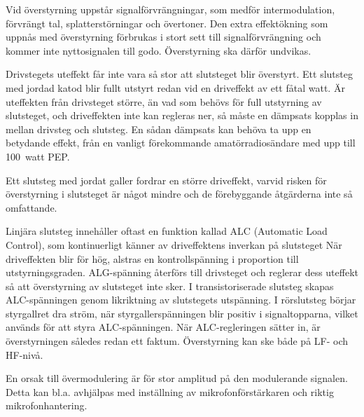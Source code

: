 Vid överstyrning uppstår signalförvrängningar, som medför
intermodulation, förvrängt tal, splatterstörningar och övertoner. Den
extra effektökning som uppnås med överstyrning förbrukas i stort sett
till signalförvrängning och kommer inte nyttosignalen till
godo. Överstyrning ska därför undvikas.

Drivstegets uteffekt får inte vara så stor att slutsteget blir
överstyrt. Ett slutsteg med jordad katod blir fullt utstyrt redan vid
en driveffekt av ett fåtal watt. Är uteffekten från drivsteget större,
än vad som behövs för full utstyrning av slutsteget, och driveffekten
inte kan regleras ner, så måste en dämpsats kopplas in mellan drivsteg
och slutsteg. En sådan dämpsats kan behöva ta upp en betydande effekt,
från en vanligt förekommande amatörradiosändare med upp till 100~watt PEP.

Ett slutsteg med jordat galler fordrar en större driveffekt, varvid
risken för överstyrning i slutsteget är något mindre och de
förebyggande åtgärderna inte så omfattande.

Linjära slutsteg innehåller oftast en funktion kallad ALC (Automatic
Load Control), som kontinuerligt känner av driveffektens inverkan på
slutsteget När driveffekten blir för hög, alstras en kontrollspänning
i proportion till utstyrningsgraden. ALG-spänning återförs till
drivsteget och reglerar dess uteffekt så att överstyrning av
slutsteget inte sker. I transistoriserade slutsteg skapas
ALC-spänningen genom likriktning av slutstegets utspänning.
I rörslutsteg börjar styrgallret dra ström, när styrgallerspänningen
blir positiv i signaltopparna, vilket används för att styra
ALC-spänningen. När ALC-regleringen sätter in, är överstyrningen
således redan ett faktum. Överstyrning kan ske både på LF- och HF-nivå.

En orsak till övermodulering är för stor amplitud på den modulerande
signalen. Detta kan bl.a. avhjälpas med inställning av
mikrofonförstärkaren och riktig mikrofonhantering.
